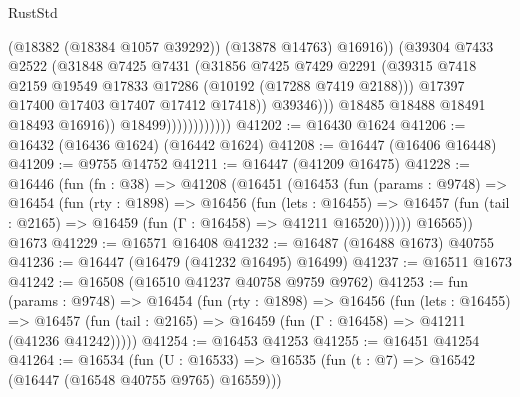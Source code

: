 \begin{lexlean}{RustStd}
\begin{coremodule}
                                        (@18382 (@18384 @1057 @39292))
                                        (@13878 @14763)
                                        @16916))
                                    (@39304
                                      @7433
                                      @2522
                                      (@31848
                                        @7425
                                        @7431
                                        (@31856
                                          @7425
                                          @7429
                                          @2291
                                          (@39315
                                            @7418
                                            @2159
                                            @19549
                                            @17833
                                            @17286
                                            (@10192 (@17288 @7419 @2188)))
                                          @17397
                                          @17400
                                          @17403
                                          @17407
                                          @17412
                                          @17418))
                                      @39346)))
                                @18485
                                @18488
                                @18491
                                @18493
                                @16916))
                            @18499))))))))))))
@41202 := @16430 @1624
@41206 := @16432 (@16436 @1624) (@16442 @1624)
@41208 := @16447 (@16406 @16448)
@41209 := @9755 @14752
@41211 := @16447 (@41209 @16475)
@41228 := @16446
    (fun (fn : @38) =>
    @41208
      (@16451
        (@16453
          (fun (params : @9748) =>
          @16454
            (fun (rty : @1898) =>
            @16456
              (fun (lets : @16455) =>
              @16457 (fun (tail : @2165) => @16459 (fun (Γ : @16458) => @41211 @16520))))))
        @16565))
    @1673
@41229 := @16571 @16408
@41232 := @16487 (@16488 @1673) @40755
@41236 := @16447 (@16479 (@41232 @16495) @16499)
@41237 := @16511 @1673
@41242 := @16508 (@16510 @41237 @40758 @9759 @9762)
@41253 := fun (params : @9748) =>
  @16454
    (fun (rty : @1898) =>
    @16456
      (fun (lets : @16455) =>
      @16457 (fun (tail : @2165) => @16459 (fun (Γ : @16458) => @41211 (@41236 @41242)))))
@41254 := @16453 @41253
@41255 := @16451 @41254
@41264 := @16534
    (fun (U : @16533) => @16535 (fun (t : @7) => @16542 (@16447 (@16548 @40755 @9765) @16559)))

\end{coremodule}
\end{lexlean}
